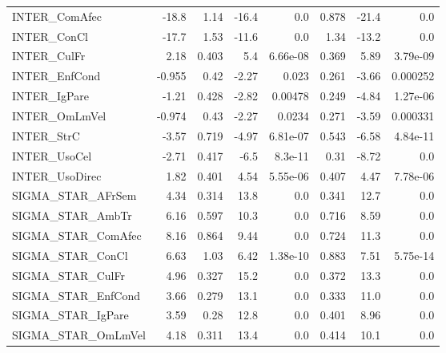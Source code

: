 \begin{tabular}{lrrrrrrr}
INTER\_ComAfec       &   -18.8 &     1.14 &   -16.4 &      0.0 &         0.878 &        -21.4 &           0.0 \\
INTER\_ConCl         &   -17.7 &     1.53 &   -11.6 &      0.0 &          1.34 &        -13.2 &           0.0 \\
INTER\_CulFr         &    2.18 &    0.403 &     5.4 & 6.66e-08 &         0.369 &         5.89 &      3.79e-09 \\
INTER\_EnfCond       &  -0.955 &     0.42 &   -2.27 &    0.023 &         0.261 &        -3.66 &      0.000252 \\
INTER\_IgPare        &   -1.21 &    0.428 &   -2.82 &  0.00478 &         0.249 &        -4.84 &      1.27e-06 \\
INTER\_OmLmVel       &  -0.974 &     0.43 &   -2.27 &   0.0234 &         0.271 &        -3.59 &      0.000331 \\
INTER\_StrC          &   -3.57 &    0.719 &   -4.97 & 6.81e-07 &         0.543 &        -6.58 &      4.84e-11 \\
INTER\_UsoCel        &   -2.71 &    0.417 &    -6.5 &  8.3e-11 &          0.31 &        -8.72 &           0.0 \\
INTER\_UsoDirec      &    1.82 &    0.401 &    4.54 & 5.55e-06 &         0.407 &         4.47 &      7.78e-06 \\
SIGMA\_STAR\_AFrSem   &    4.34 &    0.314 &    13.8 &      0.0 &         0.341 &         12.7 &           0.0 \\
SIGMA\_STAR\_AmbTr    &    6.16 &    0.597 &    10.3 &      0.0 &         0.716 &         8.59 &           0.0 \\
SIGMA\_STAR\_ComAfec  &    8.16 &    0.864 &    9.44 &      0.0 &         0.724 &         11.3 &           0.0 \\
SIGMA\_STAR\_ConCl    &    6.63 &     1.03 &    6.42 & 1.38e-10 &         0.883 &         7.51 &      5.75e-14 \\
SIGMA\_STAR\_CulFr    &    4.96 &    0.327 &    15.2 &      0.0 &         0.372 &         13.3 &           0.0 \\
SIGMA\_STAR\_EnfCond  &    3.66 &    0.279 &    13.1 &      0.0 &         0.333 &         11.0 &           0.0 \\
SIGMA\_STAR\_IgPare   &    3.59 &     0.28 &    12.8 &      0.0 &         0.401 &         8.96 &           0.0 \\
SIGMA\_STAR\_OmLmVel  &    4.18 &    0.311 &    13.4 &      0.0 &         0.414 &         10.1 &           0.0 \\

\end{tabular}
